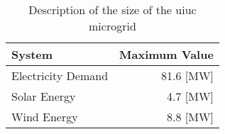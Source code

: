 \begin{table}[h]
  \centering
  \caption{Description of the size of the \gls{uiuc} microgrid}
  \label{tab:capacity}
  \begin{tabular}{l r}
    \hline
    System & Maximum Value\\
    \hline
    Electricity Demand & 81.6 [MW]\\
    Solar Energy & 4.7 [MW]\\
    Wind Energy & 8.8 [MW]\\
    \hline
  \end{tabular}
\end{table}
